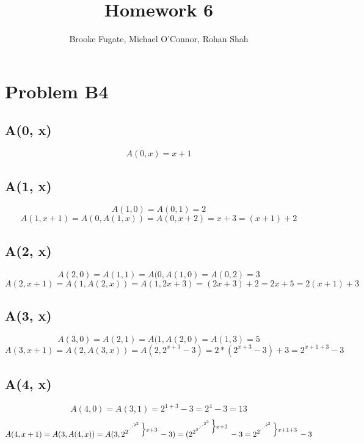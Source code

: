 \documentclass[12pt]{article}
\begin{document}
\pagestyle{plain}
\titleformat{\subsection}[runin]
  {\normalfont\large\bfseries}{\thesubsection}{1em}{}
\titleformat{\subsubsection}[runin]
  {\bfseries}{}{1em}{}

\title{Homework 6}
\author{Brooke Fugate, Michael O'Connor, Rohan Shah}
\date{}

\maketitle

\section*{Problem B4}
\subsection*{A(0, x)} 
$$A(0, x) = x + 1$$
\subsection*{A(1, x)}
$$A(1, 0) = A(0, 1) = 2$$
$$A(1, x + 1) = A(0, A(1, x)) = A(0, x + 2) = x + 3 = (x + 1) +2$$
\subsection*{A(2, x)} 
$$A(2, 0) = A(1, 1) = A(0, A(1, 0) = A(0, 2) = 3$$
$$A(2, x + 1) = A(1, A(2, x)) = A(1, 2x + 3) = (2x + 3) +2 = 2x + 5 = 2(x + 1) + 3$$
\subsection*{A(3, x)} 
$$A(3, 0) = A(2, 1) = A(1, A(2, 0) = A(1, 3) = 5$$
$$A(3, x + 1) = A(2, A(3, x)) = A(2, 2^{x + 3} - 3) = 2*(2^{x+3} - 3)  + 3 = 2^{x + 1 + 3} - 3$$
\subsection*{A(4, x)} 
$$A(4, 0) = A(3, 1) = 2^{1 + 3} - 3 = 2^4 -3 = 13$$
$$A(4, x + 1) = A(3, A(4, x)) = A(3,  \supexpo{2}{2}{x + 3}\> - 3) = (2^{\supexpo{2}{2}{x + 3}\>} - 3 = \supexpo{2}{2}{x + 1 + 3}\> - 3$$
\end{document}
